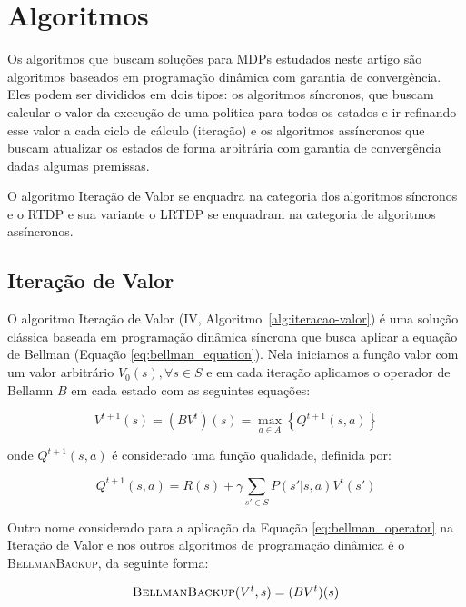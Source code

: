 \documentclass[letterpaper]{article}
\begin{document}
\section{Algoritmos}

Os algoritmos que buscam soluções para MDPs estudados neste artigo são algoritmos baseados em programação dinâmica com garantia de convergência. Eles podem ser divididos em dois tipos: os algoritmos síncronos, que buscam calcular o valor da execução de uma política para todos os estados e ir refinando esse valor a cada ciclo de cálculo (iteração) e os algoritmos assíncronos que buscam atualizar os estados de forma arbitrária com garantia de convergência dadas algumas premissas.

O algoritmo Iteração de Valor \cite{Howard-1960} se enquadra na categoria dos algoritmos síncronos e o RTDP \cite{BartoBradtkeSingh-1995} e sua variante o LRTDP \cite{BonetGeffer-2003} se enquadram na categoria de algoritmos assíncronos.

\subsection{Iteração de Valor}

O algoritmo Iteração de Valor (IV, Algoritmo~\ref{alg:iteracao-valor}) é uma solução clássica baseada em programação dinâmica síncrona que busca aplicar a equação de Bellman (Equação \ref{eq:bellman_equation}). Nela iniciamos a função valor com um valor arbitrário $V_0(s), \forall s \in S$ e em cada iteração aplicamos o operador de Bellamn $B$ em cada estado com as seguintes equações:

\begin{equation} \label{eq:bellman_operator}
    V^{t+1}(s) = (BV^t)(s) = \max_{a \in A} \left\{ Q^{t+1}(s,a) \right\}
\end{equation}

onde $ Q^{t+1}(s,a) $ é considerado uma função qualidade, definida por:

\begin{equation} \label{eq:quality_function}
    Q^{t+1}(s,a) = R(s) + \gamma \sum_{s'\in S} P(s'|s,a)V^t(s')
\end{equation}

Outro nome considerado para a aplicação da Equação \ref{eq:bellman_operator} na Iteração de Valor e nos outros algoritmos de programação dinâmica é o \textsc{BellmanBackup}, da seguinte forma:

\begin{equation} \label{eq:bellman_backup}
    \textsc{BellmanBackup}(V^t, s) = (BV^t)(s)
\end{equation}
\end{document}
